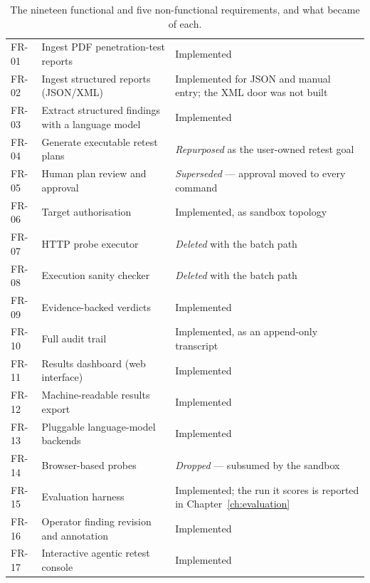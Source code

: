 \begin{table}[!htbp]
\caption[Requirements and their status in the delivered system]{The nineteen functional and five non-functional requirements, and what became of each.}
\label{tab:requirements}
\scriptsize
\renewcommand{\arraystretch}{1.10}
\begin{center}
\begin{tabular}{|L{1.5cm}|L{6.6cm}|L{4.4cm}|}
\hline
{}
 &  &  \\ \hline
FR-01 & Ingest PDF penetration-test reports & Implemented \\ \hline
FR-02 & Ingest structured reports (JSON/XML) & Implemented for JSON and manual entry; the XML door was not built \\ \hline
FR-03 & Extract structured findings with a language model & Implemented \\ \hline
FR-04 & Generate executable retest plans & \emph{Repurposed} as the user-owned retest goal \\ \hline
FR-05 & Human plan review and approval & \emph{Superseded} --- approval moved to every command \\ \hline
FR-06 & Target authorisation & Implemented, as sandbox topology \\ \hline
FR-07 & HTTP probe executor & \emph{Deleted} with the batch path \\ \hline
FR-08 & Execution sanity checker & \emph{Deleted} with the batch path \\ \hline
FR-09 & Evidence-backed verdicts & Implemented \\ \hline
FR-10 & Full audit trail & Implemented, as an append-only transcript \\ \hline
FR-11 & Results dashboard (web interface) & Implemented \\ \hline
FR-12 & Machine-readable results export & Implemented \\ \hline
FR-13 & Pluggable language-model backends & Implemented \\ \hline
FR-14 & Browser-based probes & \emph{Dropped} --- subsumed by the sandbox \\ \hline
FR-15 & Evaluation harness & Implemented; the run it scores is reported in Chapter~\ref{ch:evaluation} \\ \hline
FR-16 & Operator finding revision and annotation & Implemented \\ \hline
FR-17 & Interactive agentic retest console & Implemented \\ \hline

\end{tabular}
\end{center}
\end{table}
